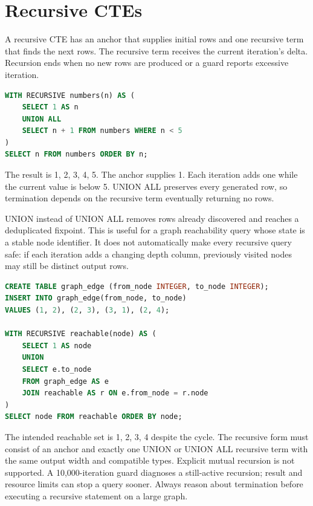 \section{Recursive CTEs}

A recursive CTE has an anchor that supplies initial rows and one recursive term that finds the next rows. The recursive term receives the current iteration's delta. Recursion ends when no new rows are produced or a guard reports excessive iteration.

\begin{lstlisting}[language=SQL]
WITH RECURSIVE numbers(n) AS (
    SELECT 1 AS n
    UNION ALL
    SELECT n + 1 FROM numbers WHERE n < 5
)
SELECT n FROM numbers ORDER BY n;
\end{lstlisting}

The result is 1, 2, 3, 4, 5. The anchor supplies 1. Each iteration adds one while the current value is below 5. UNION ALL preserves every generated row, so termination depends on the recursive term eventually returning no rows.

UNION instead of UNION ALL removes rows already discovered and reaches a deduplicated fixpoint. This is useful for a graph reachability query whose state is a stable node identifier. It does not automatically make every recursive query safe: if each iteration adds a changing depth column, previously visited nodes may still be distinct output rows.

\begin{lstlisting}[language=SQL]
CREATE TABLE graph_edge (from_node INTEGER, to_node INTEGER);
INSERT INTO graph_edge(from_node, to_node)
VALUES (1, 2), (2, 3), (3, 1), (2, 4);

WITH RECURSIVE reachable(node) AS (
    SELECT 1 AS node
    UNION
    SELECT e.to_node
    FROM graph_edge AS e
    JOIN reachable AS r ON e.from_node = r.node
)
SELECT node FROM reachable ORDER BY node;
\end{lstlisting}

The intended reachable set is 1, 2, 3, 4 despite the cycle. The recursive form must consist of an anchor and exactly one UNION or UNION ALL recursive term with the same output width and compatible types. Explicit mutual recursion is not supported. A 10,000-iteration guard diagnoses a still-active recursion; result and resource limits can stop a query sooner. Always reason about termination before executing a recursive statement on a large graph.


